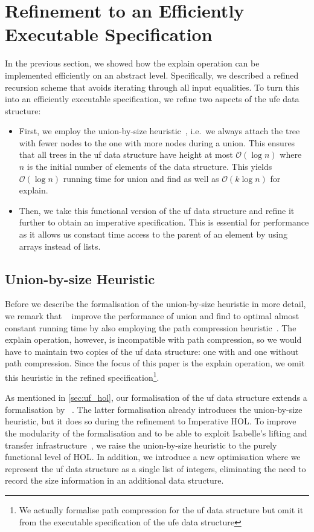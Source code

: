 \documentclass[
  sigplan,
  10pt,
  anonymous,
  review,
  ]{acmart}
\newcommand{\opexplain}{explain}
\begin{document}
\section{Refinement to an Efficiently Executable Specification}
In the previous section, we showed how the \opexplain{} operation can be implemented efficiently on an abstract level.
Specifically, we described a refined recursion scheme that avoids iterating through all input equalities.
To turn this into an efficiently executable specification, we refine two aspects of the \acrshort{ufe} data structure:
\begin{itemize}
  \item First, we employ the union-by-size heuristic~\cite{uf_by_size}, i.e.\ we always attach the tree with fewer nodes to the one with more nodes during a union. 
  This ensures that all trees in the \acrshort{uf} data structure have height at most $\mathcal{O}(\log n)$ where $n$ is the initial number of elements of the data structure.
  This yields $\mathcal{O}(\log n)$ running time for union and find as well as $\mathcal{O}(k \log n)$ for explain.
  \item Then, we take this functional version of the \acrshort{uf} data structure and refine it further to obtain an imperative specification. 
    This is essential for performance as it allows us constant time access to the parent of an element by using arrays instead of lists.
\end{itemize}

\subsection{Union-by-size Heuristic}
Before we describe the formalisation of the union-by-size heuristic in more detail, 
we remark that \citeauthor{congcl_proofs}~\cite{congcl_proofs} improve the performance of union and find to optimal almost constant running time by also employing the path compression heuristic~\cite{uf_compress}.
The \opexplain{} operation, however, is incompatible with path compression, so we would have to maintain two copies of the \acrshort{uf} data structure: one with and one without path compression.
Since the focus of this paper is the \opexplain{} operation, we omit this heuristic in the refined specification\footnote{We actually formalise path compression for the \acrshort{uf} data structure but omit it from the executable specification of the \acrshort{ufe} data structure}.

As mentioned in \autoref{sec:uf_hol}, our formalisation of the \acrshort{uf} data structure extends a formalisation by \citeauthor{uf_isabelle}~\cite{uf_isabelle,uf_isabelle_afp}.
The latter formalisation already introduces the union-by-size heuristic, but it does so during the refinement to Imperative HOL.
To improve the modularity of the formalisation and to be able to exploit Isabelle's lifting and transfer infrastructure~\cite{lifting_transfer},
we raise the union-by-size heuristic to the purely functional level of HOL.
In addition, we introduce a new optimisation where we represent the \acrshort{uf} data structure as a single list of integers, eliminating the need to record the size information in an additional data structure.
\end{document}
